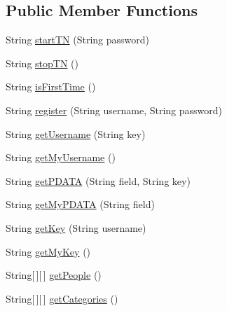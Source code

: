 \subsection*{Public Member Functions}
\begin{DoxyCompactItemize}
\item 
String \hyperlink{interfaceballmerpeak_1_1turtlenet_1_1client_1_1Turtlenet_ad2c185cc33495082c8da75b56de3923d}{start\-T\-N} (String password)
\item 
String \hyperlink{interfaceballmerpeak_1_1turtlenet_1_1client_1_1Turtlenet_ab9c5f257cca5e02901ffd588965963be}{stop\-T\-N} ()
\item 
String \hyperlink{interfaceballmerpeak_1_1turtlenet_1_1client_1_1Turtlenet_af9208c1d9cb46ce3470a33df4a1a4df9}{is\-First\-Time} ()
\item 
String \hyperlink{interfaceballmerpeak_1_1turtlenet_1_1client_1_1Turtlenet_ad64cfc9925dcd72033616bbdb04949a0}{register} (String username, String password)
\item 
String \hyperlink{interfaceballmerpeak_1_1turtlenet_1_1client_1_1Turtlenet_a7be22b6c4de115ee3842215390327a01}{get\-Username} (String key)
\item 
String \hyperlink{interfaceballmerpeak_1_1turtlenet_1_1client_1_1Turtlenet_a1403ccfe05dbc6d8c1634b9ee495db15}{get\-My\-Username} ()
\item 
String \hyperlink{interfaceballmerpeak_1_1turtlenet_1_1client_1_1Turtlenet_ad8ee0ed3492a6014119f93e924f7e08c}{get\-P\-D\-A\-T\-A} (String field, String key)
\item 
String \hyperlink{interfaceballmerpeak_1_1turtlenet_1_1client_1_1Turtlenet_a6e1aec0d0b894cc034a058e6a1e59f8d}{get\-My\-P\-D\-A\-T\-A} (String field)
\item 
String \hyperlink{interfaceballmerpeak_1_1turtlenet_1_1client_1_1Turtlenet_a1e027a6781273a6004088c007652bbfb}{get\-Key} (String username)
\item 
String \hyperlink{interfaceballmerpeak_1_1turtlenet_1_1client_1_1Turtlenet_a92f271e68b3fe28daaff65852546f0b7}{get\-My\-Key} ()
\item 
String\mbox{[}$\,$\mbox{]}\mbox{[}$\,$\mbox{]} \hyperlink{interfaceballmerpeak_1_1turtlenet_1_1client_1_1Turtlenet_ac9f6b1c3381cbfe692ec418c5a20de72}{get\-People} ()
\item 
String\mbox{[}$\,$\mbox{]}\mbox{[}$\,$\mbox{]} \hyperlink{interfaceballmerpeak_1_1turtlenet_1_1client_1_1Turtlenet_a1576427e28630ba76693f57bb6c6e8e5}{get\-Categories} ()
\item 

\end{DoxyCompactItemize}
